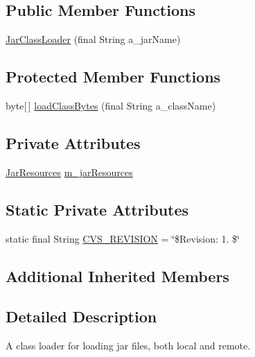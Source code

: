 \subsection*{Public Member Functions}
\begin{DoxyCompactItemize}
\item 
\hyperlink{classorg_1_1jgap_1_1util_1_1_jar_class_loader_a9d966cb08ba19b2aded12e9ba1377218}{Jar\-Class\-Loader} (final String a\-\_\-jar\-Name)
\end{DoxyCompactItemize}
\subsection*{Protected Member Functions}
\begin{DoxyCompactItemize}
\item 
byte\mbox{[}$\,$\mbox{]} \hyperlink{classorg_1_1jgap_1_1util_1_1_jar_class_loader_aa3a789fc7b8816981a82be84e93dea40}{load\-Class\-Bytes} (final String a\-\_\-class\-Name)
\end{DoxyCompactItemize}
\subsection*{Private Attributes}
\begin{DoxyCompactItemize}
\item 
\hyperlink{classorg_1_1jgap_1_1util_1_1_jar_resources}{Jar\-Resources} \hyperlink{classorg_1_1jgap_1_1util_1_1_jar_class_loader_a000e53524a68ae339edf16105977397b}{m\-\_\-jar\-Resources}
\end{DoxyCompactItemize}
\subsection*{Static Private Attributes}
\begin{DoxyCompactItemize}
\item 
static final String \hyperlink{classorg_1_1jgap_1_1util_1_1_jar_class_loader_a3de58256ce21ba05f55b2518a7f21031}{C\-V\-S\-\_\-\-R\-E\-V\-I\-S\-I\-O\-N} = \char`\"{}\$Revision\-: 1. \$\char`\"{}
\end{DoxyCompactItemize}
\subsection*{Additional Inherited Members}


\subsection{Detailed Description}
A class loader for loading jar files, both local and remote.

